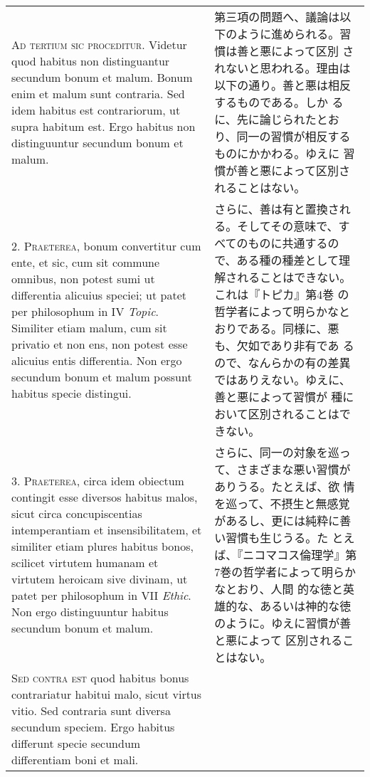 \documentclass[10pt]{jsarticle}
\begin{document}
\begin{longtable}{p{21em}p{21em}}

{\scshape Ad tertium sic proceditur}. Videtur quod habitus non
distinguantur secundum bonum et malum. Bonum enim et malum sunt
contraria. Sed idem habitus est contrariorum, ut supra habitum
est. Ergo habitus non distinguuntur secundum bonum et malum.

&

第三項の問題へ、議論は以下のように進められる。習慣は善と悪によって区別
されないと思われる。理由は以下の通り。善と悪は相反するものである。しか
るに、先に論じられたとおり、同一の習慣が相反するものにかかわる。ゆえに
習慣が善と悪によって区別されることはない。

\\

2. {\scshape Praeterea}, bonum convertitur cum ente, et sic, cum sit
commune omnibus, non potest sumi ut differentia alicuius speciei; ut
patet per philosophum in IV {\itshape Topic}. Similiter etiam malum,
cum sit privatio et non ens, non potest esse alicuius entis
differentia. Non ergo secundum bonum et malum possunt habitus specie
distingui.

&

さらに、善は有と置換される。そしてその意味で、すべてのものに共通するの
で、ある種の種差として理解されることはできない。これは『トピカ』第4巻
の哲学者によって明らかなとおりである。同様に、悪も、欠如であり非有であ
るので、なんらかの有の差異ではありえない。ゆえに、善と悪によって習慣が
種において区別されることはできない。

\\

3. {\scshape Praeterea}, circa idem obiectum contingit esse diversos
habitus malos, sicut circa concupiscentias intemperantiam et
insensibilitatem, et similiter etiam plures habitus bonos, scilicet
virtutem humanam et virtutem heroicam sive divinam, ut patet per
philosophum in VII {\itshape Ethic}. Non ergo distinguuntur habitus
secundum bonum et malum.

&

さらに、同一の対象を巡って、さまざまな悪い習慣がありうる。たとえば、欲
情を巡って、不摂生と無感覚があるし、更には純粋に善い習慣も生じうる。た
とえば、『ニコマコス倫理学』第7巻の哲学者によって明らかなとおり、人間
的な徳と英雄的な、あるいは神的な徳のように。ゆえに習慣が善と悪によって
区別されることはない。

\\

{\scshape Sed contra est} quod habitus bonus contrariatur habitui
malo, sicut virtus vitio. Sed contraria sunt diversa secundum
speciem. Ergo habitus differunt specie secundum differentiam boni et
mali.


\end{longtable}
\end{document}

